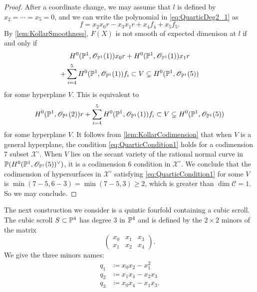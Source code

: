 \begin{proof}
After a coordinate change, we may assume that $l$ is defined by $x_2 = \cdots = x_5 = 0$, and we can write the polynomial in \eqref{eq:QuarticDeg2_1} as
\begin{equation}
	\label{eq:QuarticDeg2_2}
	f = x_2x_0r - x_3x_1r + x_4f_4 + x_5f_5.
\end{equation}
By \cref{lem:KollarSmoothness}, $F(X)$ is not smooth of expected dimenison at $l$ if and only if
\begin{gather*}
H^0(\P^1,\sO_{\P^1}(1))x_0r + H^0(\P^1,\sO_{\P^1}(1))x_1r
\\ +  \sum_{i=4}^{5}H^0(\P^1,\sO_{\P^1}(1))f_i \subset V \subsetneq H^0(\P^1,\sO_{\P^1}(5))
\end{gather*}
for some hyperplane $V$.
This is equivalent to 
\begin{equation}
	\label{eq:QuarticCondition1}
	H^0(\P^1,\sO_{\P^1}(2))r + \sum_{i=4}^{5}H^0(\P^1,\sO_{\P^1}(1))f_i \subset V \subsetneq H^0(\P^1,\sO_{\P^1}(5))
\end{equation}
for some hyperplane $V$.
It follows from \cref{lem:KollarCodimension} that when $V$ is a general hyperplane, the condition \eqref{eq:QuarticCondition1} holds for a codimension 7 subset $\mathscr{X}^\circ$. When $V$ lies on the secant variety of the rational normal curve in $\P(H^0(\P^1,\sO_{\P^1}(5))^\vee)$, it is a codimension 6 condition in $\mathscr{X}^\circ$. We conclude that the codimension of hypersurfaces in $\mathscr{X}^\circ$ satisfying \eqref{eq:QuarticCondition1} for some $V$ is $\min(7-5,6-3) = \min(7-5,3) \geq 2$, which is greater than $\dim {\mathcal{C}} = 1$. So we may conclude.
\end{proof}

The next construction we consider is a quintic fourfold containing a cubic scroll.
The cubic scroll $S \subset \P^4$ has degree 3 in $\P^4$ and is defined by the $2 \times 2$ minors of the matrix
\begin{equation*}
	\begin{pmatrix}
		x_0 & x_1 & x_3 \\
		x_1 & x_2 & x_4
	\end{pmatrix}.
\end{equation*}
We give the three minors names:
\begin{align*}
	q_1 &\coloneqq x_0x_2 - x_1^2 \\
	q_2 &\coloneqq x_1x_4 - x_2x_3 \\
	q_3 &\coloneqq x_0x_4 - x_1x_3. \\
\end{align*}

